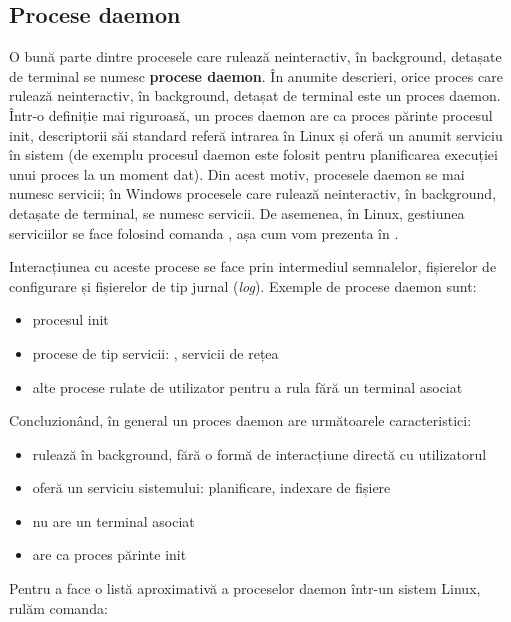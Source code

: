 \subsection{Procese daemon}
\label{sec:process:daemon}

O bună parte dintre procesele care rulează neinteractiv, în background, detașate
de terminal se numesc \textbf{procese daemon}. În anumite descrieri, orice proces care
rulează neinteractiv, în background, detașat de terminal este un proces daemon.
Într-o definiție mai riguroasă, un proces daemon are ca proces părinte procesul
init, descriptorii săi standard referă intrarea  în Linux și oferă un
anumit serviciu în sistem (de exemplu procesul daemon  este folosit pentru
planificarea execuției unui proces la un moment dat). Din acest motiv, procesele
daemon se mai numesc servicii; în Windows procesele care rulează neinteractiv,
în background, detașate de terminal, se numesc servicii. De asemenea, în Linux,
gestiunea serviciilor se face folosind comanda , așa cum vom prezenta în
.

Interacțiunea cu aceste procese se face prin intermediul semnalelor, fișierelor
de configurare și fișierelor de tip jurnal (\textit{log}). Exemple de procese daemon
sunt:

\begin{itemize}
	\item procesul init
        \item procese de tip servicii: , servicii de rețea
	\item alte procese rulate de utilizator pentru a rula fără un terminal asociat
\end{itemize}

Concluzionând, în general un proces daemon are următoarele caracteristici:

\begin{itemize}
	\item rulează în background, fără o formă de interacțiune directă cu utilizatorul
	\item oferă un serviciu sistemului: planificare, indexare de fișiere
	\item nu are un terminal asociat
	\item are ca proces părinte init
\end{itemize}

Pentru a face o listă aproximativă a proceselor daemon într-un sistem Linux, rulăm comanda:


